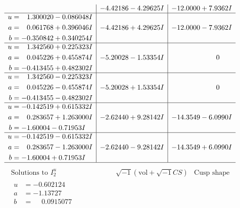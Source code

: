 \documentclass[1p]{elsarticle_modified}
\theoremstyle{definition}
\newcommand{\I}{\sqrt{-1}}
\begin{document}
$$\begin{array}{c|c|c}
 & -4.42186 - 4.29625 I & -12.0000 + 7.9362 I \\ \hline\begin{aligned}
u &= \phantom{-}1.300020 - 0.086048 I \\
a &= \phantom{-}0.061768 + 0.396046 I \\
b &= -0.350842 + 0.340254 I\end{aligned}
 & -4.42186 + 4.29625 I & -12.0000 - 7.9362 I \\ \hline\begin{aligned}
u &= \phantom{-}1.342560 + 0.225323 I \\
a &= \phantom{-}0.045226 + 0.455874 I \\
b &= -0.413455 + 0.482302 I\end{aligned}
 & -5.20028 - 1.53354 I & \phantom{-0.000000 } 0 \\ \hline\begin{aligned}
u &= \phantom{-}1.342560 - 0.225323 I \\
a &= \phantom{-}0.045226 - 0.455874 I \\
b &= -0.413455 - 0.482302 I\end{aligned}
 & -5.20028 + 1.53354 I & \phantom{-0.000000 } 0 \\ \hline\begin{aligned}
u &= -0.142519 + 0.615332 I \\
a &= \phantom{-}0.283657 + 1.263000 I \\
b &= -1.60004 - 0.71953 I\end{aligned}
 & -2.62440 + 9.28142 I & -14.3549 - 6.0990 I \\ \hline\begin{aligned}
u &= -0.142519 - 0.615332 I \\
a &= \phantom{-}0.283657 - 1.263000 I \\
b &= -1.60004 + 0.71953 I\end{aligned}
 & -2.62440 - 9.28142 I & -14.3549 + 6.0990 I\\
 \hline 
 \end{array}$$\newpage$$\begin{array}{c|c|c}  
\text{Solutions to }I^u_{2}& \I (\text{vol} + \sqrt{-1}CS) & \text{Cusp shape}\\
 \hline 
\begin{aligned}
u &= -0.602124\phantom{ +0.000000I} \\
a &= -1.13727\phantom{ +0.000000I} \\
b &= \phantom{-}0.0915077\phantom{ +0.000000I}\end{aligned}

\end{array}$$
\end{document}
